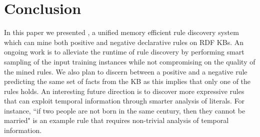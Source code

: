 \section{Conclusion}

In this paper we presented \krd, a unified memory efficient rule discovery system which can mine both positive and negative declarative rules on RDF KBs. 
An ongoing work is to alleviate the runtime of rule discovery by performing smart sampling of the input training instances while not compromising on the quality of the mined rules. We also plan to discern between a positive and a negative rule predicting the same set of facts from the KB as this implies that only one of the rules holds. 
An interesting future direction is to discover more expressive rules that can exploit temporal information through smarter analysis of literals. For instance, ``if two people are not born in the same century, then they cannot be married" is an example rule that requires non-trivial analysis of temporal information. 


